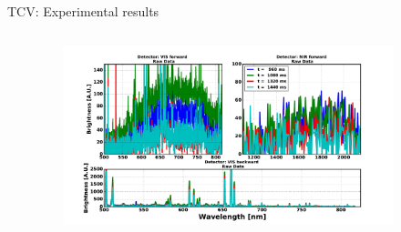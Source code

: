 \documentclass{beamer}
\begin{document}
\begin{frame}{TCV: Experimental results}
\begin{columns}
\begin{column}{0.4\textwidth}
\begin{left}
    	     \end{left}
    	\end{column}
    	\begin{column}{0.6\textwidth}  %
    	
    			\begin{figure}
    				\begin{center}
    					\includegraphics[width=0.9\textwidth]{chapterreisfig/tcv/spectra_58664_.pdf}
    				\end{center}
    			\end{figure}
    	
    	\end{column}
    \end{columns} 

\end{frame}


\end{document}
